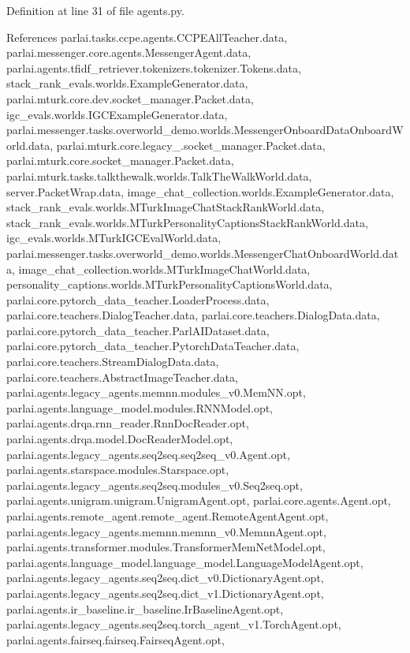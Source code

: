 Definition at line 31 of file agents.\+py.



References parlai.\+tasks.\+ccpe.\+agents.\+C\+C\+P\+E\+All\+Teacher.\+data, parlai.\+messenger.\+core.\+agents.\+Messenger\+Agent.\+data, parlai.\+agents.\+tfidf\+\_\+retriever.\+tokenizers.\+tokenizer.\+Tokens.\+data, stack\+\_\+rank\+\_\+evals.\+worlds.\+Example\+Generator.\+data, parlai.\+mturk.\+core.\+dev.\+socket\+\_\+manager.\+Packet.\+data, igc\+\_\+evals.\+worlds.\+I\+G\+C\+Example\+Generator.\+data, parlai.\+messenger.\+tasks.\+overworld\+\_\+demo.\+worlds.\+Messenger\+Onboard\+Data\+Onboard\+World.\+data, parlai.\+mturk.\+core.\+legacy\+\_.\+socket\+\_\+manager.\+Packet.\+data, parlai.\+mturk.\+core.\+socket\+\_\+manager.\+Packet.\+data, parlai.\+mturk.\+tasks.\+talkthewalk.\+worlds.\+Talk\+The\+Walk\+World.\+data, server.\+Packet\+Wrap.\+data, image\+\_\+chat\+\_\+collection.\+worlds.\+Example\+Generator.\+data, stack\+\_\+rank\+\_\+evals.\+worlds.\+M\+Turk\+Image\+Chat\+Stack\+Rank\+World.\+data, stack\+\_\+rank\+\_\+evals.\+worlds.\+M\+Turk\+Personality\+Captions\+Stack\+Rank\+World.\+data, igc\+\_\+evals.\+worlds.\+M\+Turk\+I\+G\+C\+Eval\+World.\+data, parlai.\+messenger.\+tasks.\+overworld\+\_\+demo.\+worlds.\+Messenger\+Chat\+Onboard\+World.\+data, image\+\_\+chat\+\_\+collection.\+worlds.\+M\+Turk\+Image\+Chat\+World.\+data, personality\+\_\+captions.\+worlds.\+M\+Turk\+Personality\+Captions\+World.\+data, parlai.\+core.\+pytorch\+\_\+data\+\_\+teacher.\+Loader\+Process.\+data, parlai.\+core.\+teachers.\+Dialog\+Teacher.\+data, parlai.\+core.\+teachers.\+Dialog\+Data.\+data, parlai.\+core.\+pytorch\+\_\+data\+\_\+teacher.\+Parl\+A\+I\+Dataset.\+data, parlai.\+core.\+pytorch\+\_\+data\+\_\+teacher.\+Pytorch\+Data\+Teacher.\+data, parlai.\+core.\+teachers.\+Stream\+Dialog\+Data.\+data, parlai.\+core.\+teachers.\+Abstract\+Image\+Teacher.\+data, parlai.\+agents.\+legacy\+\_\+agents.\+memnn.\+modules\+\_\+v0.\+Mem\+N\+N.\+opt, parlai.\+agents.\+language\+\_\+model.\+modules.\+R\+N\+N\+Model.\+opt, parlai.\+agents.\+drqa.\+rnn\+\_\+reader.\+Rnn\+Doc\+Reader.\+opt, parlai.\+agents.\+drqa.\+model.\+Doc\+Reader\+Model.\+opt, parlai.\+agents.\+legacy\+\_\+agents.\+seq2seq.\+seq2seq\+\_\+v0.\+Agent.\+opt, parlai.\+agents.\+starspace.\+modules.\+Starspace.\+opt, parlai.\+agents.\+legacy\+\_\+agents.\+seq2seq.\+modules\+\_\+v0.\+Seq2seq.\+opt, parlai.\+agents.\+unigram.\+unigram.\+Unigram\+Agent.\+opt, parlai.\+core.\+agents.\+Agent.\+opt, parlai.\+agents.\+remote\+\_\+agent.\+remote\+\_\+agent.\+Remote\+Agent\+Agent.\+opt, parlai.\+agents.\+legacy\+\_\+agents.\+memnn.\+memnn\+\_\+v0.\+Memnn\+Agent.\+opt, parlai.\+agents.\+transformer.\+modules.\+Transformer\+Mem\+Net\+Model.\+opt, parlai.\+agents.\+language\+\_\+model.\+language\+\_\+model.\+Language\+Model\+Agent.\+opt, parlai.\+agents.\+legacy\+\_\+agents.\+seq2seq.\+dict\+\_\+v0.\+Dictionary\+Agent.\+opt, parlai.\+agents.\+legacy\+\_\+agents.\+seq2seq.\+dict\+\_\+v1.\+Dictionary\+Agent.\+opt, parlai.\+agents.\+ir\+\_\+baseline.\+ir\+\_\+baseline.\+Ir\+Baseline\+Agent.\+opt, parlai.\+agents.\+legacy\+\_\+agents.\+seq2seq.\+torch\+\_\+agent\+\_\+v1.\+Torch\+Agent.\+opt, parlai.\+agents.\+fairseq.\+fairseq.\+Fairseq\+Agent.\+opt, 